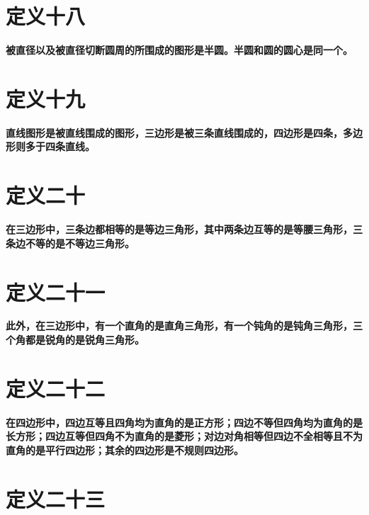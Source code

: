 \documentclass[
]{book}
\begin{document}
\hypertarget{ux5b9aux4e49ux5341ux516b}{%
\section{定义十八}\label{ux5b9aux4e49ux5341ux516b}}

\textbf{被直径以及被直径切断圆周的所围成的图形是半圆。半圆和圆的圆心是同一个。}

\hypertarget{ux5b9aux4e49ux5341ux4e5d}{%
\section{定义十九}\label{ux5b9aux4e49ux5341ux4e5d}}

\textbf{直线图形是被直线围成的图形，三边形是被三条直线围成的，四边形是四条，多边形则多于四条直线。}

\hypertarget{ux5b9aux4e49ux4e8cux5341}{%
\section{定义二十}\label{ux5b9aux4e49ux4e8cux5341}}

\textbf{在三边形中，三条边都相等的是等边三角形，其中两条边互等的是等腰三角形，三条边不等的是不等边三角形。}

\hypertarget{ux5b9aux4e49ux4e8cux5341ux4e00}{%
\section{定义二十一}\label{ux5b9aux4e49ux4e8cux5341ux4e00}}

\textbf{此外，在三边形中，有一个直角的是直角三角形，有一个钝角的是钝角三角形，三个角都是锐角的是锐角三角形。}

\hypertarget{ux5b9aux4e49ux4e8cux5341ux4e8c}{%
\section{定义二十二}\label{ux5b9aux4e49ux4e8cux5341ux4e8c}}

\textbf{在四边形中，四边互等且四角均为直角的是正方形；四边不等但四角均为直角的是长方形；四边互等但四角不为直角的是菱形；对边对角相等但四边不全相等且不为直角的是平行四边形；其余的四边形是不规则四边形。}

\hypertarget{ux5b9aux4e49ux4e8cux5341ux4e09}{%
\section{定义二十三}\label{ux5b9aux4e49ux4e8cux5341ux4e09}}
\end{document}
